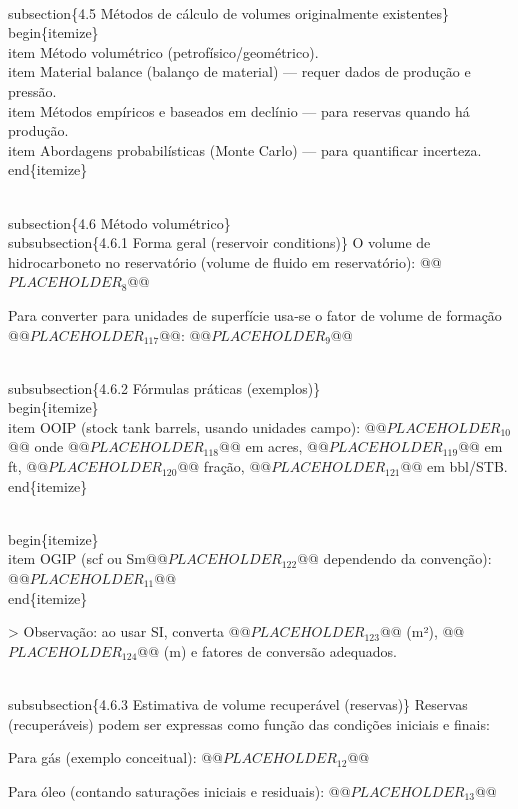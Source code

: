 \documentclass[11pt,a4paper]{article}
\begin{document}
\begin{enumerate}
{\\subsection\{4.5 Métodos de cálculo de volumes originalmente existentes\}
\\begin\{itemize\}
\\item Método volumétrico (petrofísico/geométrico).
\\item Material balance (balanço de material) — requer dados de produção e pressão.
\\item Métodos empíricos e baseados em declínio — para reservas quando há produção.
\\item Abordagens probabilísticas (Monte Carlo) — para quantificar incerteza.
\\end\{itemize\}

\\subsection\{4.6 Método volumétrico\}
\\subsubsection\{4.6.1 Forma geral (reservoir conditions)\}
O volume de hidrocarboneto no reservatório (volume de fluido em reservatório):
@@$PLACEHOLDER_{8}$@@

Para converter para unidades de superfície usa‑se o fator de volume de formação @@$PLACEHOLDER_{117}$@@:
@@$PLACEHOLDER_{9}$@@

\\subsubsection\{4.6.2 Fórmulas práticas (exemplos)\}
\\begin\{itemize\}
\\item OOIP (stock tank barrels, usando unidades campo):
@@$PLACEHOLDER_{10}$@@
onde @@$PLACEHOLDER_{118}$@@ em acres, @@$PLACEHOLDER_{119}$@@ em ft, @@$PLACEHOLDER_{120}$@@ fração, @@$PLACEHOLDER_{121}$@@ em bbl/STB.
\\end\{itemize\}

\\begin\{itemize\}
\\item OGIP (scf ou Sm@@$PLACEHOLDER_{122}$@@ dependendo da convenção):
@@$PLACEHOLDER_{11}$@@
\\end\{itemize\}

> Observação: ao usar SI, converta @@$PLACEHOLDER_{123}$@@ (m²), @@$PLACEHOLDER_{124}$@@ (m) e fatores de conversão adequados.

\\subsubsection\{4.6.3 Estimativa de volume recuperável (reservas)\}
Reservas (recuperáveis) podem ser expressas como função das condições iniciais e finais:

Para gás (exemplo conceitual):
@@$PLACEHOLDER_{12}$@@

Para óleo (contando saturações iniciais e residuais):
@@$PLACEHOLDER_{13}$@@

}
\end{enumerate}
\end{document}
